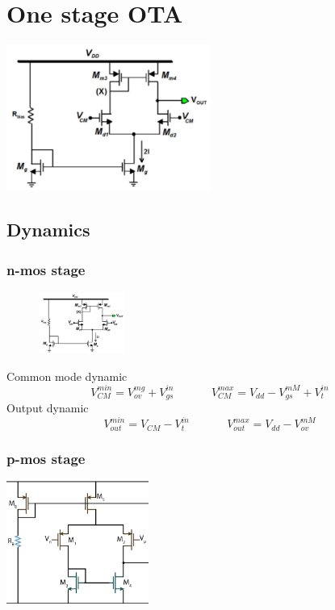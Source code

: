 \chapter{One stage OTA}

\centering
\includegraphics[width=0.5\textwidth]{OTA1.png}\\
\raggedright

\section{Dynamics}

\subsection{n-mos stage}

\begin{figure}
\includegraphics[width=0.25\textwidth]{OTA1.png}
\end{figure}

Common mode dynamic
\begin{equation}
V_{CM}^{min}=V_{ov}^{mg}+V_{gs}^{in}\ \ \ \ \ \ \ \ \ \ \ \ \ \ \ V_{CM}^{max}=V_{dd}-V_{gs}^{mM}+V_t^{in}
\end{equation}
Output dynamic 
\begin{equation}
V_{out}^{min}=V_{CM}-V_t^{in}\ \ \ \ \ \ \ \ \ \ \ \ \ \ \ V_{out}^{max}=V_{dd}-V_{ov}^{mM}
\end{equation}
\vspace{1mm}

\subsection{p-mos stage}

\centering
\includegraphics[width=0.35\textwidth]{OTA2.png}\\
\raggedright

